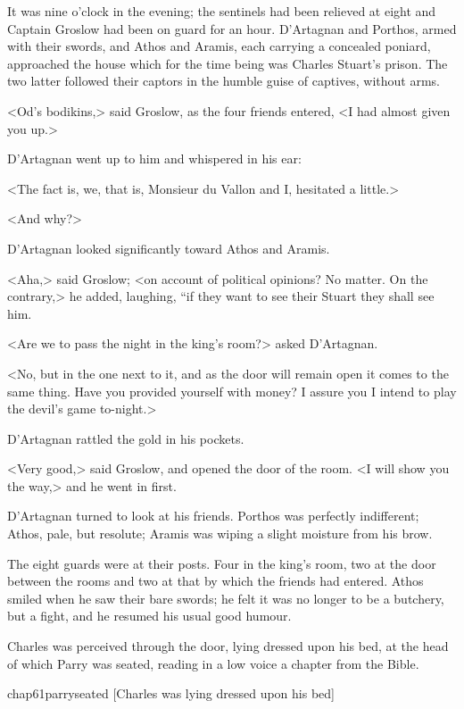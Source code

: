 It was nine o'clock in the evening; the sentinels had been relieved at eight and Captain Groslow had been on guard for an hour. D'Artagnan and Porthos, armed with their swords, and Athos and Aramis, each carrying a concealed poniard, approached the house which for the time being was Charles Stuart's prison. The two latter followed their captors in the humble guise of captives, without arms.

<Od's bodikins,> said Groslow, as the four friends entered, <I had almost given you up.>

D'Artagnan went up to him and whispered in his ear:

<The fact is, we, that is, Monsieur du Vallon and I, hesitated a little.>

<And why?>

D'Artagnan looked significantly toward Athos and Aramis.

<Aha,> said Groslow; <on account of political opinions? No matter. On the contrary,> he added, laughing, “if they want to see their Stuart they shall see him.

<Are we to pass the night in the king's room?> asked D'Artagnan.

<No, but in the one next to it, and as the door will remain open it comes to the same thing. Have you provided yourself with money? I assure you I intend to play the devil's game to-night.>

D'Artagnan rattled the gold in his pockets.

<Very good,> said Groslow, and opened the door of the room. <I will show you the way,> and he went in first.

D'Artagnan turned to look at his friends. Porthos was perfectly indifferent; Athos, pale, but resolute; Aramis was wiping a slight moisture from his brow.

The eight guards were at their posts. Four in the king's room, two at the door between the rooms and two at that by which the friends had entered. Athos smiled when he saw their bare swords; he felt it was no longer to be a butchery, but a fight, and he resumed his usual good humour.

Charles was perceived through the door, lying dressed upon his bed, at the head of which Parry was seated, reading in a low voice a chapter from the Bible.

\begin{bwbigpic}
	[\basicscale] 
	{chap61parryseated}
	[Charles was lying dressed upon his bed]
\end{bwbigpic}


